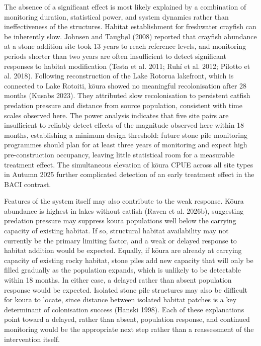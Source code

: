 \documentclass[
  12pt,
  a4paper,
  oneside]{scrbook}
\begin{document}
The absence of a significant effect is most likely explained by a
combination of monitoring duration, statistical power, and system
dynamics rather than ineffectiveness of the structures. Habitat
establishment for freshwater crayfish can be inherently slow. Johnsen
and Taugbøl (2008) reported that crayfish abundance at a stone addition
site took 13 years to reach reference levels, and monitoring periods
shorter than two years are often insufficient to detect significant
responses to habitat modification (Testa et al. 2011; Ruhí et al. 2012;
Pilotto et al. 2018). Following reconstruction of the Lake Rotorua
lakefront, which is connected to Lake Rotoiti, kōura showed no
meaningful recolonisation after 28 months (Kusabs 2023). They attributed
slow recolonisation to persistent catfish predation pressure and
distance from source population, consistent with time scales observed
here. The power analysis indicates that five site pairs are insufficient
to reliably detect effects of the magnitude observed here within 18
months, establishing a minimum design threshold: future stone pile
monitoring programmes should plan for at least three years of monitoring
and expect high pre-construction occupancy, leaving little statistical
room for a measurable treatment effect. The simultaneous elevation of
kōura CPUE across all site types in Autumn 2025 further complicated
detection of an early treatment effect in the BACI contrast.

Features of the system itself may also contribute to the weak response.
Kōura abundance is highest in lakes without catfish (Raven et al.
2026b), suggesting predation pressure may suppress kōura populations
well below the carrying capacity of existing habitat. If so, structural
habitat availability may not currently be the primary limiting factor,
and a weak or delayed response to habitat addition would be expected.
Equally, if kōura are already at carrying capacity of existing rocky
habitat, stone piles add new capacity that will only be filled gradually
as the population expands, which is unlikely to be detectable within 18
months. In either case, a delayed rather than absent population response
would be expected. Isolated stone pile structures may also be difficult
for kōura to locate, since distance between isolated habitat patches is
a key determinant of colonisation success (Hanski 1998). Each of these
explanations point toward a delayed, rather than absent, population
response, and continued monitoring would be the appropriate next step
rather than a reassessment of the intervention itself.
\end{document}
